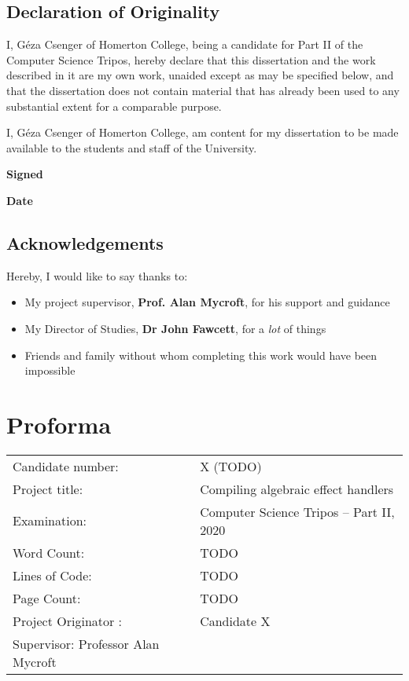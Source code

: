 \documentclass[%
    12pt,
    a4paper,
    bibliography=toc,
    listof=leveldown,%
    oneside
]{book}
\begin{document}


\frontmatter

\section*{Declaration of Originality}

I, Géza Csenger of Homerton College,
being a candidate for Part II of the Computer Science Tripos,
hereby declare that this dissertation and the work described in it
are my own work, unaided except as may be specified below, and
that the dissertation does not contain material that has already
been used to any substantial extent for a comparable purpose.

I, Géza Csenger of Homerton College,
am content for my dissertation to be made available to the students and staff of the University. 

\vspace{1cm}
\textbf{Signed}

\vspace{1cm}
\textbf{Date}

\vspace{3cm}

\section*{Acknowledgements}

Hereby, I would like to say thanks to:
\begin{itemize}
    \item My project supervisor, \textbf{Prof. Alan Mycroft}, for his support and guidance
    \item My Director of Studies, \textbf{Dr John Fawcett}, for a \emph{lot} of things
    \item Friends and family without whom completing this work would have been impossible
\end{itemize}

\newpage

\chapter{Proforma}

\begin{tabular}{@{} ll @{}}
Candidate number: & X (TODO) \\
Project title: & Compiling algebraic effect handlers \\
Examination: & Computer Science Tripos -- Part II, 2020 \\
Word Count: & TODO \\
Lines of Code: & TODO \\
Page Count: & TODO \\
Project Originator : & Candidate X \\
Supervisor: Professor Alan Mycroft \\
\end{tabular}
\end{document}
